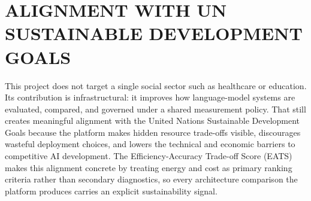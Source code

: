 \chapter*{ALIGNMENT WITH UN SUSTAINABLE DEVELOPMENT GOALS}

This project does not target a single social sector such as healthcare or education.
Its contribution is infrastructural: it improves how language-model systems are evaluated,
compared, and governed under a shared measurement policy.
That still creates meaningful alignment with the United Nations Sustainable Development Goals
because the platform makes hidden resource trade-offs visible, discourages wasteful deployment
choices, and lowers the technical and economic barriers to competitive AI development.
The Efficiency-Accuracy Trade-off Score (EATS) makes this alignment concrete by treating
energy and cost as primary ranking criteria rather than secondary diagnostics,
so every architecture comparison the platform produces carries an explicit sustainability signal.

